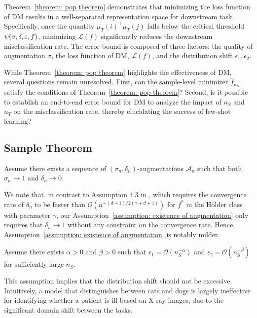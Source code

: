 Theorem~\ref{theorem: pop theorem} demonstrates that minimizing the loss function of DM results in a well-separated representation space for downstream task. Specifically, once the quantity $\mu_T(i)^{\top}\mu_T(j)$ falls below the critical threshold $\psi(\sigma, \delta, \varepsilon, f)$, minimizing $\mathcal{L}(f)$ significantly reduces the downstream misclassification rate. The error bound is composed of three factors: the quality of augmentation $\sigma$, the loss function of DM, $\mathcal{L}(f)$, and the distribution shift $\epsilon_1, \epsilon_2$.

While Theorem~\ref{theorem: pop theorem} highlights the effectiveness of DM, several questions remain unresolved. First, can the sample-level minimizer $\hat{f}_{n_S}$ satisfy the conditions of Theorem~\ref{theorem: pop theorem}? Second, is it possible to establish an end-to-end error bound for DM to analyze the impact of $n_S$ and $n_T$ on the misclassification rate,
thereby elucidating the success of few-shot learning?
\subsection{Sample Theorem}\label{subsection: sample theorem}
\begin{assumption}\label{assumption: existence of augmentation}
    Assume there exists a sequence of $(\sigma_n, \delta_n)$-augmentations $\mathcal
    {A}_n$ such that both $\sigma_n \to 1$ and $\delta_n \to 0$.
\end{assumption}
We note that, in contrast to Assumption 4.3 in \citet{duan2024unsupervisedtransferlearningadversarial}, which requires the convergence rate of $\delta_n$ to be faster than $\mathcal{O}(n^{-(d + 1)/2(\gamma + d + 1)})$ for $f^*$ in the H{\"o}lder class with parameter $\gamma$, our Assumption~\ref{assumption: existence of augmentation} only requires that $\delta_n \to 1$ without any constraint on the convergence rate. Hence, Assumption~\ref{assumption: existence of augmentation} is notably milder.

\begin{assumption}\label{assumption: distributions shift < n}
    Assume there exists $\alpha > 0$ and $\beta > 0$ such that $\epsilon_1 = \mathcal{O}(n_S^{-\alpha})$ and $\epsilon_2 =\mathcal{O}(n_S^{-\beta})$ for sufficiently large $n_S$.
\end{assumption}
This assumption implies that the distribution shift should not be excessive. Intuitively, a model that distinguishes between cats and dogs is largely ineffective for identifying whether a patient is ill based on X-ray images, due to the significant domain shift between the tasks.


